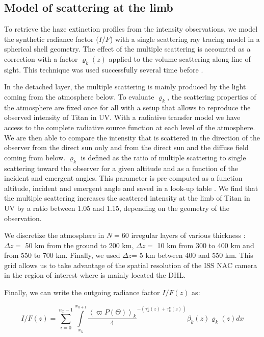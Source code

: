 \subsection{Model of scattering at the limb}

To retrieve the haze extinction profiles from the intensity observations, we model the synthetic
radiance factor ($I/F$) with a single scattering ray tracing model in a spherical shell geometry.
The effect of the multiple scattering is accounted as a correction with a factor $\varrho_k\left(z\right)$
applied to the volume scattering along line of sight.
This technique was used successfully several time before \citep[e.g.][]{Rages1983, Rannou1997, Seignovert2017, West2018}.

In the detached layer, the multiple scattering is mainly produced by the light coming from the atmosphere below. To
evaluate $\varrho_k$, the scattering properties of the atmosphere are fixed once for all with a setup that allows to
reproduce the observed intensity of Titan in UV. With a radiative transfer model \citep[SHDOMPP, from ][]{Evans1998}
we have access to the complete radiative source function at each level of the atmosphere. We are then able to compare the
intensity that is scattered in the direction of the observer from the direct sun only and from the direct sun and the diffuse
field coming from below. $\varrho_k$ is defined as the ratio of multiple scattering to single scattering toward the observer
for a given altitude and as a function of the incident and emergent angles. This parameter is pre-computed as a function
altitude, incident and emergent angle and saved in a look-up table \citep[see.][for details]{West2018}.
We find that the multiple scattering increases the scattered intensity at the limb of Titan in UV by a ratio between
1.05 and 1.15, depending on the geometry of the observation.

We discretize the atmosphere in $N=60$ irregular layers of various thickness : $\Delta z =$ 50 km from the
ground to 200 km, $\Delta z =$ 10 km from 300 to 400 km and from 550 to 700 km. Finally, we used
$\Delta z$= 5 km between 400 and 550 km. This grid allows us to take advantage of the spatial resolution
of the ISS NAC camera in the region of interest where is mainly located the DHL.

Finally, we can write the outgoing radiance factor $I/F (z)$ as:

\begin{equation}
I/F (z) = \sum_{i=0}^{n_x-1} \int\limits_{x_k}^{x_{k+1}}
\frac{\left< \varpi P(\Theta) \right>_k} {4}
^{-\left( \tau^i_k\left(z\right) + \tau^e_k\left(z\right) \right)}
\beta_k\left(z\right) \varrho_k\left(z\right) d{x}
\label{eq:west2017_sup_limb}
\end{equation}

